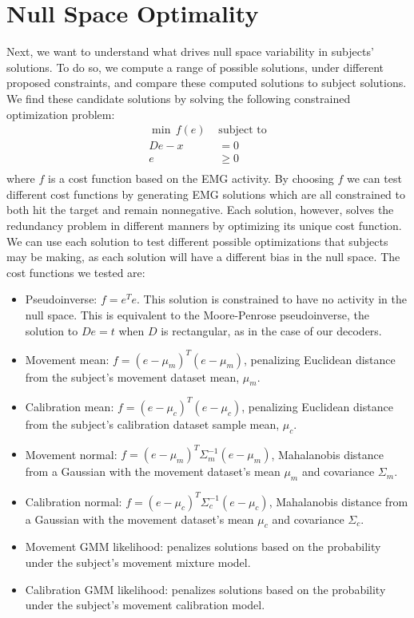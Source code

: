 \documentclass[../main.tex]{subfiles}
\begin{document}
  
  
  
  \section{Null Space Optimality}

    Next, we want to understand what drives null space variability in subjects' solutions. To do so, we compute a range of possible solutions, under different proposed constraints, and compare these computed solutions to subject solutions. We find these candidate solutions by solving the following constrained optimization problem:
    \begin{align*}
      \min \,f(e) \,\, &\mathrm{subject \,\, to}\\
      De - x &= 0\\
      e &\geq 0\\
    \end{align*}
    where $f$ is a cost function based on the EMG activity. By choosing $f$ we can test different cost functions by generating EMG solutions which are all constrained to both hit the target and remain nonnegative. Each solution, however, solves the redundancy problem in different manners by optimizing its unique cost function. We can use each solution to test different possible optimizations that subjects may be making, as each solution will have a different bias in the null space. The cost functions we tested are:
    \begin{itemize}
      \item Pseudoinverse: $f = e^Te$. This solution is constrained to have no activity in the null space. This is equivalent to the Moore-Penrose pseudoinverse, the solution to $De=t$ when $D$ is rectangular, as in the case of our decoders.
      \item Movement mean: $f = (e - \mu_m)^T(e - \mu_m)$, penalizing Euclidean distance from the subject's movement dataset mean, $\mu_m$.
      \item Calibration mean: $f = (e - \mu_c)^T(e - \mu_c)$, penalizing Euclidean distance from the subject's calibration dataset sample mean, $\mu_c$.
      \item Movement normal: $f = (e - \mu_m)^T\Sigma_m^{-1}(e - \mu_m)$, Mahalanobis distance from a Gaussian with the movement dataset's mean $\mu_m$ and covariance $\Sigma_m$.
      \item Calibration normal: $f = (e - \mu_c)^T\Sigma_c^{-1}(e - \mu_c)$, Mahalanobis distance from a Gaussian with the movement dataset's mean $\mu_c$ and covariance $\Sigma_c$.
      \item Movement GMM likelihood: penalizes solutions based on the probability under the subject's movement mixture model.
      \item Calibration GMM likelihood: penalizes solutions based on the probability under the subject's movement calibration model.
    \end{itemize}
\end{document}
